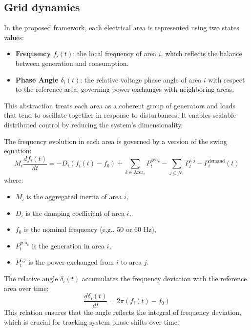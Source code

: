 \documentclass{article}
\begin{document}
\subsection{Grid dynamics}
In the proposed framework, each electrical area is represented using two states values:
\begin{itemize}
    \item \textbf{Frequency} $f_i(t)$: the local frequency of area $i$, which reflects the balance between generation and consumption.
    \item \textbf{Phase Angle} $\delta_i(t)$: the relative voltage phase angle of area $i$ with respect to the reference area, governing power exchanges with neighboring areas.
\end{itemize}
This abstraction treats each area as a coherent group of generators and loads that tend to oscillate together in response to disturbances. It enables scalable distributed control by reducing the system's dimensionality.

The frequency evolution in each area is governed by a version of the swing equation:
\begin{equation}
    M_i \frac{df_i(t)}{dt} = -D_i(f_i(t) - f_0) + \sum_{k \in \text{Area}_i} P^{\text{gen}_k}_{t} - \sum_{j \in \mathcal{N}_i} P^{i,j}_t - P^{\text{demand}}_i(t)
\end{equation}
where:
\begin{itemize}
    \item $M_i$ is the aggregated inertia of area $i$,
    \item $D_i$ is the damping coefficient of area $i$,
    \item $f_0$ is the nominal frequency (e.g., 50 or 60 Hz),
    \item $P^{\text{gen}_k}_t$ is the generation in area $i$,
    \item $P^{i,j}_t$ is the power exchanged from $i$ to area $j$.
\end{itemize}

The relative angle $\delta_i(t)$ accumulates the frequency deviation with the reference area over time:
\begin{equation}
    \frac{d\delta_i(t)}{dt} = 2\pi(f_i(t) - f_0)
\end{equation}
This relation ensures that the angle reflects the integral of frequency deviation, which is crucial for tracking system phase shifts over time. 
\end{document}
